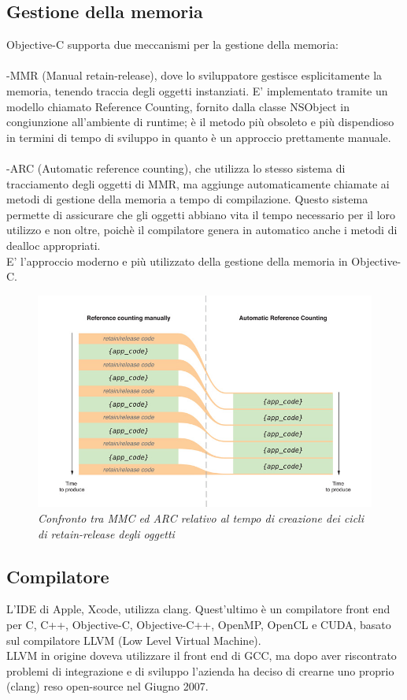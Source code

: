 \subsection{Gestione della memoria}
Objective-C supporta due meccanismi per la gestione della memoria:\\
\\-MMR (Manual retain-release), dove lo sviluppatore gestisce esplicitamente la memoria, tenendo traccia degli oggetti instanziati. E' implementato tramite un modello chiamato Reference Counting, fornito dalla classe NSObject in congiunzione all'ambiente di runtime; è il metodo più obsoleto e più dispendioso in termini di tempo di sviluppo in quanto è un approccio prettamente manuale.\\
\\-ARC (Automatic reference counting), che utilizza lo stesso sistema di tracciamento degli oggetti di MMR, ma aggiunge automaticamente chiamate ai metodi di gestione della memoria a tempo di compilazione. Questo sistema permette di assicurare che gli oggetti abbiano vita il tempo necessario per il loro utilizzo e non oltre, poichè il compilatore genera in automatico anche i metodi di dealloc appropriati.\\E' l'approccio moderno e più utilizzato della gestione della memoria in Objective-C.
\begin{figure}
      \centering
      \includegraphics[scale=0.40]{immagini/ARC.jpg}
            \vspace{0.8cm}
            \caption{\textit{Confronto tra MMC ed ARC relativo al tempo di creazione dei cicli di retain-release degli oggetti}}
    \end{figure}
\subsection{Compilatore}
L'IDE di Apple, Xcode, utilizza clang. Quest'ultimo è un compilatore front end per C, C++, Objective-C, Objective-C++, OpenMP, OpenCL e CUDA, basato sul compilatore LLVM (Low Level Virtual Machine).\\
LLVM in origine doveva utilizzare il front end di GCC, ma dopo aver riscontrato problemi di integrazione e di sviluppo l'azienda ha deciso di crearne uno proprio (clang) reso open-source nel Giugno 2007. 

